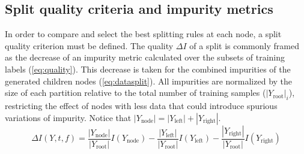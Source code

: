%


\subsection{Split quality criteria and impurity metrics}
\label{sec:criteria}

In order to compare and select the best splitting rules at each node, a split quality criterion must be defined. The quality $\Delta I$ of a split is commonly framed as the decrease of an impurity metric calculated over the subsets of training labels (\autoref{eq:quality}). This decrease is taken for the combined impurities of the generated children nodes (\autoref{eq:datasplit}).
All impurities are normalized by the size of each partition relative to the total number of training samples ($|Y_\text{root}|_i$), restricting the effect of nodes with less data that could introduce spurious variations of impurity. Notice that $|Y_\text{node}|=|Y_\text{left}|+|Y_\text{right}|$.
%
\begin{equation}
    \Delta I(Y, t, f) =
        \frac{|Y_\text{node}|}{|Y_\text{root}|} I(Y_\text{node})
        - \frac{|Y_\text{left}|}{|Y_\text{root}|} I(Y_\text{left})
        - \frac{|Y_\text{right}|}{|Y_\text{root}|} I(Y_\text{right})
    \label{eq:quality}
\end{equation}

